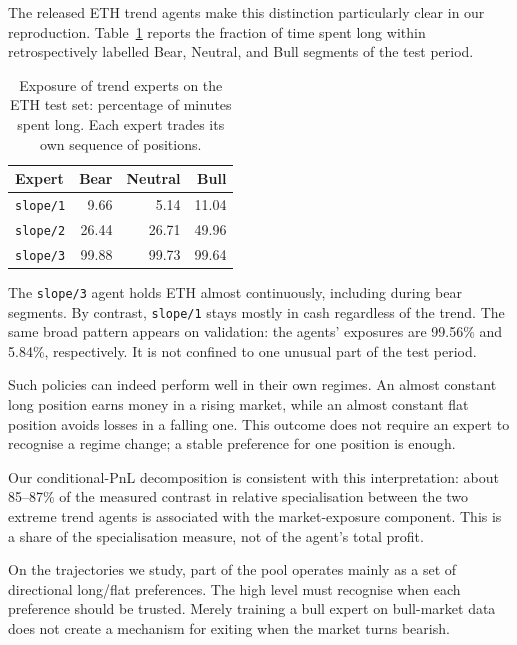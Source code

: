 \documentclass[9pt,a4paper,twocolumn]{extarticle}
\begin{document}
The released ETH trend agents make this distinction particularly clear in our reproduction.
Table~\ref{tab:conditional_exposure} reports the fraction of time spent long within retrospectively
labelled Bear, Neutral, and Bull segments of the test period.

\begin{table}[t]
  \centering
  \caption{Exposure of trend experts on the ETH test set: percentage of minutes spent long.
  Each expert trades its own sequence of positions.}
  \label{tab:conditional_exposure}
  \footnotesize
  \renewcommand{\arraystretch}{1.15}
  \begin{tabular}{@{}lrrr@{}}
    \toprule
    Expert & Bear & Neutral & Bull\\
    \midrule
    \texttt{slope/1} & 9.66 & 5.14 & 11.04\\
    \texttt{slope/2} & 26.44 & 26.71 & 49.96\\
    \texttt{slope/3} & 99.88 & 99.73 & 99.64\\
    \bottomrule
  \end{tabular}
\end{table}

The \texttt{slope/3} agent holds ETH almost continuously, including during bear segments. By
contrast, \texttt{slope/1} stays mostly in cash regardless of the trend. The same broad pattern
appears on validation: the agents' exposures are 99.56\% and 5.84\%, respectively. It is not
confined to one unusual part of the test period.

Such policies can indeed perform well in their own regimes. An almost constant long position
earns money in a rising market, while an almost constant flat position avoids losses in a falling
one. This outcome does not require an expert to recognise a regime change; a stable preference
for one position is enough.

Our conditional-PnL decomposition is consistent with this interpretation: about 85--87\% of the
measured contrast in relative specialisation between the two extreme trend agents is associated
with the market-exposure component. This is a share of the specialisation measure, not of the
agent's total profit.

On the trajectories we study, part of the pool operates mainly as a set of directional long/flat
preferences. The high level must recognise when each preference should be trusted. Merely
training a bull expert on bull-market data does not create a mechanism for exiting when the
market turns bearish.
\end{document}
